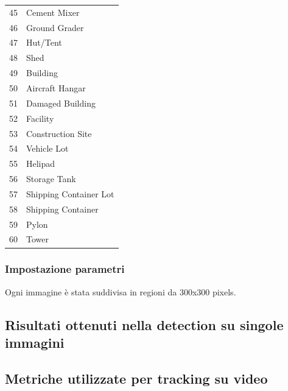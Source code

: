 \begin{center}
\begin{longtable}{|c|l|}
45 & Cement Mixer \\
46 & Ground Grader \\
47 & Hut/Tent \\
48 & Shed \\
49 & Building \\
50 & Aircraft Hangar \\
51 & Damaged Building \\
52 & Facility \\
53 & Construction Site \\
54 & Vehicle Lot \\
55 & Helipad \\
56 & Storage Tank \\
57 & Shipping Container Lot \\
58 & Shipping Container \\
59 & Pylon \\
60 & Tower \\
\end{longtable}
\end{center}

\subsubsection{Impostazione parametri}
Ogni immagine è stata suddivisa in regioni da 300x300 pixels.

\subsection{Risultati ottenuti nella detection su singole immagini}

\subsection{Metriche utilizzate per tracking su video}




